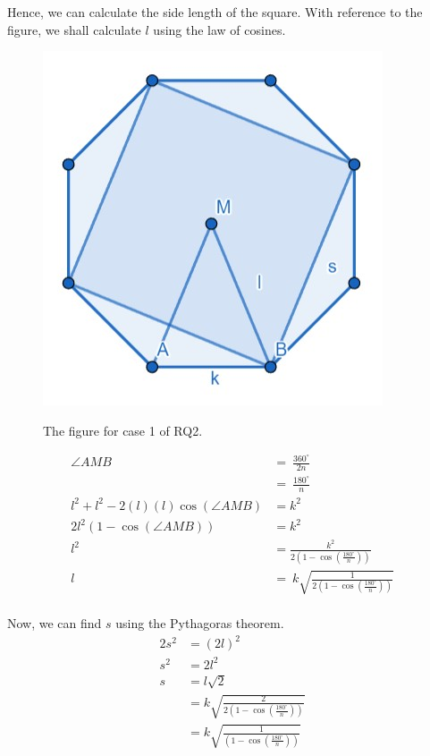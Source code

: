 \documentclass[12pt]{scrartcl}
\begin{document}
Hence, we can calculate the side length of the square. With reference to the figure, we shall calculate $l$ using the law of cosines. \\

\begin{figure}[h!]
	\centering
	\includegraphics[scale=.75]{images/rq2_1_2.jpg}
	\label{fig:rq2_1_2_img}
	\caption{The figure for case 1 of RQ2.}
\end{figure}

\begin{align*}
	\angle AMB\ & =\ \frac{360^{\circ}}{2n}\      \\
	& =\ \frac{180^{\circ}}{n}          \\
	l^{2}+l^{2}-2\left(l\right)\left(l\right)\cos\left(\angle AMB\right) & =k^{2}    \\
	2l^{2}\left(1-\cos\left(\angle AMB\right)\right)\ & =k^{2}           \\
	l^{2} & =\frac{k^{2}}{2\left(1-\cos\left(\frac{180^{\circ}}{n}\right)\right)}   \\
	l\ & =\ k\sqrt{\frac{1}{2\left(1-\cos\left(\frac{180^{\circ}}{n}\right)\right)}}    \\
\end{align*}

Now, we can find $s$ using the Pythagoras theorem. \\

\begin{align*}
  2s^{2} & = \left(2l\right)^{2}    \\
	s^{2} & = 2l^{2}   \\
	s & = l\sqrt{2}    \\
	& = k\sqrt{\frac{2}{2\left(1-\cos\left(\frac{180^{\circ}}{n}\right)\right)}} \\
	& = k\sqrt{\frac{1}{\left(1-\cos\left(\frac{180^{\circ}}{n}\right)\right)}} \\
\end{align*}

\printbibliography
\end{document}
